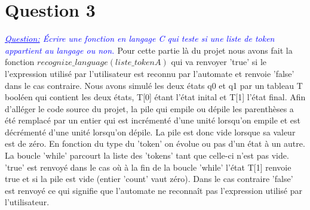 \documentclass{article}
\begin{document}
\section*{Question 3}
\textit{
\textcolor{blue}{
\underline{Question:}
 Écrire une fonction en langage C qui teste si une liste de token appartient au langage ou non.
}
}
\newline\newline
Pour cette partie là du projet nous avons fait la fonction \textit{$recognize\_language(liste\_token A)$} qui va renvoyer 'true' si le l'expression utilisé par l'utilisateur est reconnu par l'automate et renvoie 'false' dans le cas contraire. Nous avons simulé les deux états q0 et q1 par un tableau T booléen qui contient les deux états, T[0] étant l'état inital et T[1] l'état final. Afin d'alléger le code source du projet, la pile qui empile ou dépile les parenthèses a été remplacé par un entier qui est incrémenté d'une unité lorsqu'on empile et est décrémenté d'une unité lorsqu'on dépile. La pile est donc vide lorsque sa valeur est de zéro. 
\newline
En fonction du type du 'token' on évolue ou pas d'un état à un autre. La boucle 'while' parcourt la liste des 'tokens' tant que celle-ci n'est pas vide. 'true' est renvoyé dans le cas où à la fin de la boucle 'while' l'état T[1] renvoie true et si la pile est vide (entier 'count' vaut zéro). Dans le cas contraire 'false' est renvoyé ce qui signifie que l'automate ne reconnaît pas l'expression utilisé par l'utilisateur.
\end{document}
